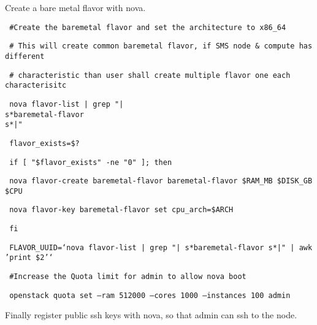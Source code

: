 \documentclass[12pt]{article}
\begin{document}
Create a bare metal flavor with nova.

\begin{bash}\texttt{\small{ \#Create the baremetal flavor and set the architecture to x86\_64}}\end{bash}
\begin{bash}\texttt{\small{     \# This will create common baremetal flavor, if SMS node \& compute has different}}\end{bash}
\begin{bash}\texttt{\small{     \# characteristic than user shall create multiple flavor one each characterisitc}}\end{bash}
\begin{bash}\texttt{\small{     nova flavor-list | grep "|\\s*baremetal-flavor\\s*|"}}\end{bash}
\begin{bash}\texttt{\small{     flavor\_exists=\$?}}\end{bash}
\begin{bash}\texttt{\small{     if [ "\$flavor\_exists" -ne "0" ]; then}}\end{bash}
\begin{bash}\texttt{\small{         nova flavor-create baremetal-flavor baremetal-flavor \${RAM\_MB} \${DISK\_GB} \${CPU}}}\end{bash}
\begin{bash}\texttt{\small{         nova flavor-key baremetal-flavor set cpu\_arch=\$ARCH}}\end{bash}
\begin{bash}\texttt{\small{     fi}}\end{bash}
\begin{bash}\texttt{\small{     FLAVOR\_UUID=`nova flavor-list | grep "|\\s*baremetal-flavor\\s*|" | awk '{print \$2}'`}}\end{bash}
\begin{bash}\texttt{\small{ \#Increase the Quota limit for admin to allow nova boot}}\end{bash}
\begin{bash}\texttt{\small{     openstack quota set --ram 512000 --cores 1000 --instances 100 admin}}\end{bash}

Finally register public ssh keys with nova, so that admin can ssh to the node.
\end{document}
